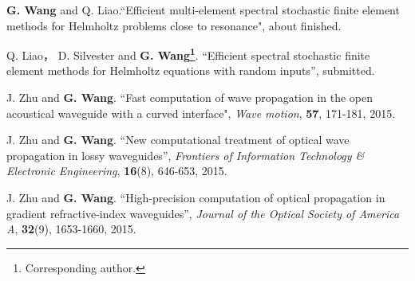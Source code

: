 \begin{publications}{99}
\item  {\bf G. Wang} and Q. Liao.``Efficient multi-element spectral stochastic finite element methods for Helmholtz problems close to resonance", about finished.
\item  Q. Liao， D. Silvester and {\bf G. Wang\footnote[1]{Corresponding author.}}. ``Efficient spectral stochastic finite element methods for Helmholtz equations with random inputs'', submitted.
\item J. Zhu and {\bf G. Wang}. ``Fast computation of wave propagation in the open acoustical waveguide with a curved interface",  {\em Wave motion}, {\bf 57}, 171-181, 2015.
\item J. Zhu and {\bf G. Wang}. ``New computational treatment of optical wave propagation in lossy waveguides'',  {\em Frontiers of Information Technology \& Electronic Engineering}, {\bf 16}(8), 646-653, 2015.
\item  J. Zhu and {\bf G. Wang}. ``High-precision computation of optical propagation in gradient refractive-index waveguides'',  {\em Journal of the Optical Society of America A}, {\bf 32}(9), 1653-1660, 2015.
\end{publications}